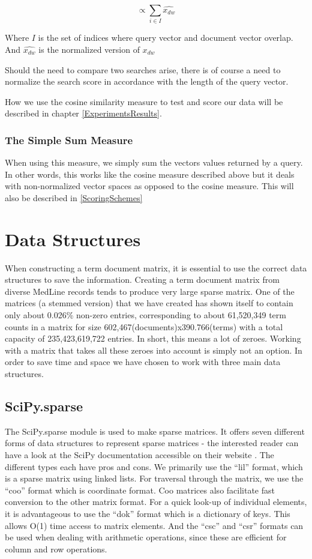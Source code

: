 \[
\propto  \sum_{i \in I} \widehat{x_{dw}}
\]

Where $I$ is the set of indices where query vector and document vector
overlap. And $\widehat{x_{dw}}$ is the normalized version of $x_{dw}$

Should the need to compare two searches arise, there is of
course a need to normalize the search score in accordance with the
length of the query vector.

How we use the cosine similarity measure to test and score our data
will be described in chapter \ref{ExperimentsResults}.

\subsubsection{The Simple Sum Measure\label{SimpleSum}}
When using this measure, we simply sum the vectors values returned by
a query. In other words, this works like the cosine measure described
above but it deals with non-normalized vector spaces as opposed to
the cosine measure. This will also be described in \ref{ScoringSchemes}

\section{Data Structures}

When constructing a term document matrix, it is essential to use the
correct data structures to save the information. Creating a term
document matrix from diverse MedLine records tends to produce very
large sparse matrix. One of the matrices (a stemmed version) that we
have created has shown itself to contain only about 0.026\% non-zero
entries, corresponding to about 61,520,349 term counts in a matrix for
size 602,467(documents)x390.766(terms) with a total capacity of
235,423,619,722 entries. In short, this means a lot of zeroes. Working
with a matrix that takes all these zeroes into account is simply not
an option. In order to save time and space we have chosen to work with three
main data structures.

\subsection{SciPy.sparse\label{SciPy_sparse}}

The SciPy.sparse module is used to make sparse matrices. It offers
seven different forms of data structures to represent sparse matrices
- the interested reader can have a look at the SciPy documentation
accessible on their website \cite{SciPy}. The different types each have pros and
cons. We primarily use the ``lil'' format, which is a sparse matrix
using linked lists. For traversal through the matrix, we use the ``coo''
format which is coordinate format. Coo matrices also facilitate fast
conversion to the other matrix format. For a quick look-up of
individual elements, it is advantageous to use the ``dok'' format which
is a dictionary of keys. This allows O(1) time access to matrix
elements. And the ``csc'' and ``csr'' formats can be used when dealing
with arithmetic operations, since these are efficient for column and
row operations.

